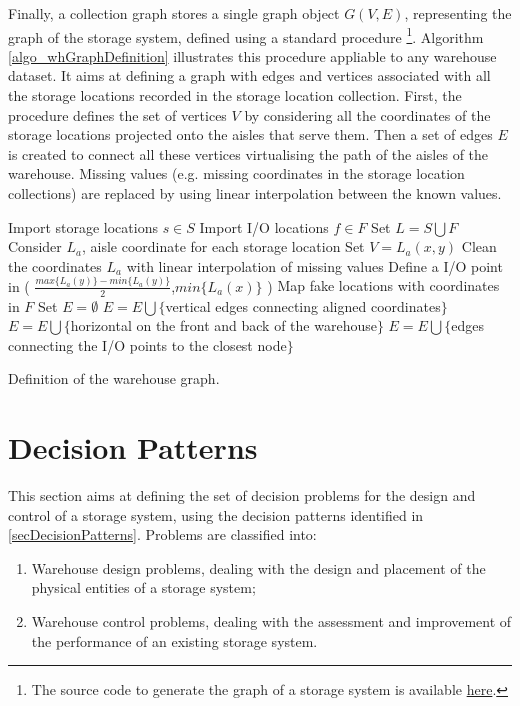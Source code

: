 Finally, a collection graph stores a single graph object $G(V,E)$, representing the graph of the storage system, defined using a standard procedure \footnote{The source code to generate the graph of a storage system is available \href{https://github.com/aletuf93/logproj/blob/master/logproj/P6_placementProblem/warehouse_graph_definition.py}{here}.}. Algorithm \ref{algo_whGraphDefinition} illustrates this procedure appliable to any warehouse dataset. It aims at defining a graph with edges and vertices associated with all the storage locations recorded in the storage location collection. First, the procedure defines the set of vertices $V$ by considering all the coordinates of the storage locations projected onto the aisles that serve them. Then a set of edges $E$ is created to connect all these vertices virtualising the path of the aisles of the warehouse. Missing values (e.g. missing coordinates in the storage location collections) are replaced by using linear interpolation between the known values.


\begin{algorithm}[H]
\DontPrintSemicolon
\SetAlgoLined


Import storage locations $s \in S$\;
Import I/O locations $f \in F$\;
Set $L={S \bigcup F}$\;
Consider $L_a$, aisle coordinate for each storage location\;
Set $V={L_{a}(x,y)}$\;
Clean the coordinates $L_a$ with linear interpolation of missing values\;
{
    {
    Define a I/O point in (
    $\frac{max\{L_a(y)\} - min\{L_a(y)\}}{2}$,$min\{L_a(x)\}$
    )\;
    }
}
Map fake locations with coordinates in $F$\;
Set $E=\emptyset$\;
$E=E\bigcup \{$vertical edges connecting aligned coordinates$\}$\;
$E=E\bigcup \{$horizontal on the front and back of the warehouse$\}$\;
$E=E\bigcup \{$edges connecting the I/O points to the closest node$\}$\;
\caption{Definition of the warehouse graph.}
\label{algo_whGraphDefinition}   
\end{algorithm}

\section{Decision Patterns}
This section aims at defining the set of decision problems for the design and control of a storage system, using the decision patterns identified in \ref{secDecisionPatterns}. Problems are classified into:

\begin{enumerate}
    \item Warehouse design problems, dealing with the design and placement of the physical entities of a storage system;
    \item Warehouse control problems, dealing with the assessment and improvement of the performance of an existing storage system.
\end{enumerate}

